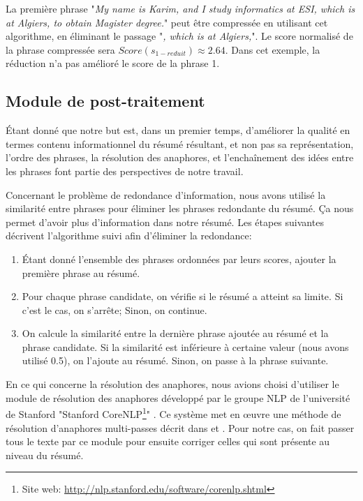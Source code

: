 \documentclass[a4paper,12pt,oneside]{../use/ESIthesis}
\begin{document}
La première phrase "\textit{My name is Karim, and I study informatics at ESI, which is at Algiers, to obtain Magister degree.}" peut être compressée en utilisant cet algorithme, en éliminant le passage "\textit{, which is at Algiers,}". 
Le score normalisé de la phrase compressée sera $ Score(s_{1-reduit}) \approx 2.64 $. 
Dans cet exemple, la réduction n'a pas amélioré le score de la phrase 1.

\subsection{Module de post-traitement}

Étant donné que notre but est, dans un premier temps, d'améliorer la qualité en termes contenu informationnel du résumé résultant, et non pas sa représentation, l'ordre des phrases, la résolution des anaphores, et l'enchaînement des idées entre les phrases font partie des perspectives de notre travail.

Concernant le problème de redondance d'information, nous avons utilisé la similarité entre phrases pour éliminer les phrases redondante du résumé. 
Ça nous permet d'avoir plus d'information dans notre résumé. 
Les étapes suivantes décrivent l'algorithme suivi afin d'éliminer la redondance:
\begin{enumerate}
\item Étant donné l'ensemble des phrases ordonnées par leurs scores, ajouter la première phrase au résumé.
\item Pour chaque phrase candidate, on vérifie si le résumé a atteint sa limite.
Si c'est le cas, on s'arrête; Sinon, on continue.
\item On calcule la similarité entre la dernière phrase ajoutée au résumé et la phrase candidate. 
Si la similarité est inférieure à certaine valeur (nous avons utilisé 0.5), on l'ajoute au résumé. 
Sinon, on passe à la phrase suivante. 
\end{enumerate}

En ce qui concerne la résolution des anaphores, nous avions choisi d'utiliser le module de résolution des anaphores développé par le groupe NLP de l'université de Stanford "Stanford CoreNLP\footnote{Site web: \url{http://nlp.stanford.edu/software/corenlp.shtml}}" \cite{13-lee-al}.
Ce système met en œuvre une méthode de résolution d'anaphores multi-passes décrit dans \cite{11-lee-al} et \cite{10-raghunathan}.
Pour notre cas, on fait passer tous le texte par ce module pour ensuite corriger celles qui sont présente au niveau du résumé.
\end{document}
